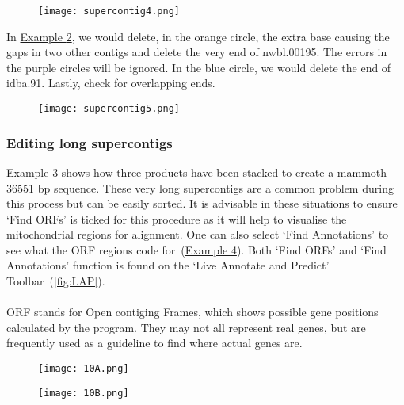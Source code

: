 \documentclass[11pt]{article}
\newcommand{\exautoref}[1]{\hyperref[#1]{Example \ref*{#1}}}
\begin{document}
\begin{figure}[H]
  \centering
    \texttt{[image: supercontig4.png]}
  \label{fig:supercontig4}
\end{figure}

In \exautoref{fig:supercontig5}, we would delete, in the orange circle, the extra base causing the gaps in two other contigs and delete the very end of nwbl.00195. The errors in the purple circles will be ignored. In the blue circle, we would delete the end of idba.91. Lastly, check for overlapping ends.

\begin{figure}[H]
  \centering
    \texttt{[image: supercontig5.png]}
  \label{fig:supercontig5}
\end{figure}

\subsubsection{Editing long supercontigs}

\exautoref{fig:10A} shows how three products have been stacked to create a mammoth 36551 bp sequence. These very long supercontigs are a common problem during this process but can be easily sorted. It is advisable in these situations to ensure `Find ORFs' is ticked for this procedure as it will help to visualise the mitochondrial regions for alignment. One can also select `Find Annotations' to see what the ORF regions code for~(\exautoref{fig:10B}). Both `Find ORFs' and `Find Annotations' function is found on the `Live Annotate and Predict' Toolbar~(\autoref{fig:LAP}).
\\
\\
ORF stands for Open contiging Frames, which shows possible gene positions calculated by the program. They may not all represent real genes, but are frequently used as a guideline to find where actual genes are.

\begin{figure}[H]
  \centering
    \texttt{[image: 10A.png]}
  \label{fig:10A}
\end{figure}

\begin{figure}[H]
  \centering
    \texttt{[image: 10B.png]}
  \label{fig:10B}
\end{figure}
\end{document}
